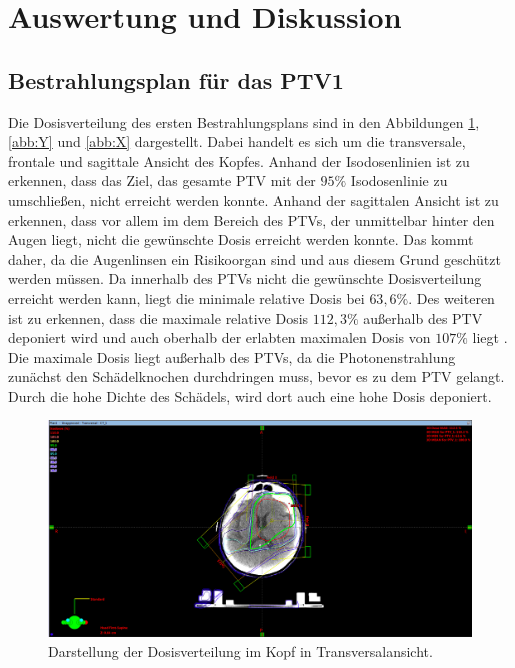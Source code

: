 \section{Auswertung und Diskussion}
\label{sec:Auswertung}

\subsection*{Bestrahlungsplan für das PTV1}

Die Dosisverteilung des ersten Bestrahlungsplans sind in den Abbildungen \ref{abb:Z}, \ref{abb:Y} und \ref{abb:X}
dargestellt. Dabei handelt es sich um die transversale, frontale und sagittale Ansicht des Kopfes.
Anhand der Isodosenlinien ist zu erkennen, dass das Ziel, das gesamte PTV mit der
$95\%$ Isodosenlinie zu umschließen, nicht erreicht werden konnte. Anhand der sagittalen Ansicht ist
zu erkennen, dass vor allem im dem Bereich des PTVs, der unmittelbar hinter den Augen liegt, nicht die gewünschte
Dosis erreicht werden konnte. Das kommt daher, da die Augenlinsen ein Risikoorgan sind und aus diesem Grund geschützt werden müssen.
Da innerhalb des PTVs nicht die gewünschte Dosisverteilung erreicht werden kann, liegt die minimale relative Dosis bei $63,6\%$.
Des weiteren ist zu erkennen, dass die maximale relative Dosis $112,3\%$ außerhalb des PTV deponiert wird und auch oberhalb der erlabten
maximalen Dosis von $107\%$ liegt \cite{ICRU}. Die maximale Dosis liegt außerhalb des PTVs, da die Photonenstrahlung zunächst den Schädelknochen
durchdringen muss, bevor es zu dem PTV gelangt. Durch die hohe Dichte des Schädels, wird dort auch eine hohe Dosis deponiert.


\begin{figure}[H]
  \centering
  \includegraphics[width=\textwidth]{Bilder/Teilhirn1_Z.png}
  \caption{Darstellung der Dosisverteilung im Kopf in Transversalansicht.}
  \label{abb:Z}
\end{figure}


